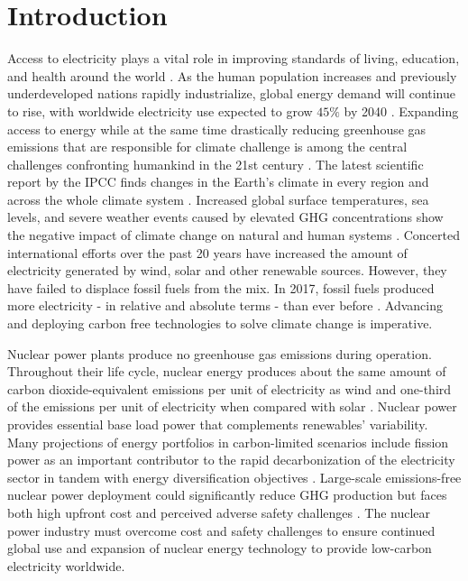 \chapter{Introduction}
\glsresetall
\label{sec:intro}

Access to electricity plays a vital role in improving standards of living, 
education, and health around the world \cite{petti_future_2018}. 
As the human population increases and previously underdeveloped 
nations rapidly industrialize, global energy demand will continue to rise, with 
worldwide electricity use expected to grow $45\%$ by 2040 
\cite{petti_future_2018,noauthor_us_nodate}.
Expanding access to energy while at the same time drastically reducing 
greenhouse gas emissions that are responsible for climate challenge 
is among the central challenges confronting humankind in the 21st century
\cite{petti_future_2018}. 
The latest scientific report by the \gls{IPCC} finds changes in the Earth's climate 
in every region and across the whole climate system \cite{noauthor_climate_nodate}. 
Increased global surface temperatures, sea levels, and severe weather events 
caused by elevated \gls{GHG} concentrations show the negative impact of 
climate change on natural and human systems \cite{noauthor_climate_2018}. 
Concerted international efforts over the past 20 years have increased the amount 
of electricity generated by wind, solar and other renewable sources. 
However, they have failed to displace fossil fuels from the mix. 
In 2017, fossil fuels produced more electricity - in relative 
and absolute terms - than ever before \cite{noauthor_nuclear_nodate}.
Advancing and deploying carbon free technologies to solve climate change 
is imperative. 

Nuclear power plants produce no greenhouse gas emissions during operation. 
Throughout their life cycle, nuclear energy produces about the same amount of carbon 
dioxide-equivalent emissions per unit of electricity as wind and one-third of 
the emissions per unit of electricity when compared with solar 
\cite{noauthor_nuclear_nodate-1}.
Nuclear power provides essential base load power that complements 
renewables' variability. 
Many projections of energy portfolios in carbon-limited scenarios include 
fission power as an important contributor to the rapid decarbonization of the 
electricity sector in tandem with energy diversification objectives 
\cite{petti_future_2018, noauthor_nuclear_nodate-1}.
Large-scale emissions-free nuclear power deployment could significantly 
reduce \gls{GHG} production but faces both high upfront cost and perceived adverse 
safety challenges \cite{noauthor_climate_2018, petti_future_2018}. 
The nuclear power industry must overcome cost and safety challenges to ensure 
continued global use and expansion of nuclear energy technology to provide 
low-carbon electricity worldwide.

